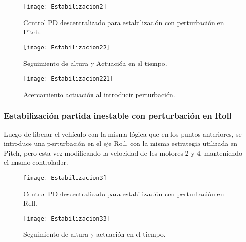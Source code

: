 \documentclass[\main/main.tex]{subfiles}
\begin{document}
\begin{figure}[H]
\noindent \begin{centering}
\texttt{[image: Estabilizacion2]}
\par\end{centering}
\caption{Control PD descentralizado para estabilización con perturbación en Pitch.}
\end{figure}

\begin{figure}[H]
\noindent \begin{centering}
\texttt{[image: Estabilizacion22]}
\par\end{centering}
\caption{Seguimiento de altura y Actuación en el tiempo.}
\end{figure}

\begin{figure}[H]
\noindent \begin{centering}
\texttt{[image: Estabilizacion221]}
\par\end{centering}
\caption{Acercamiento actuación al introducir perturbación.}
\end{figure}

\subsubsection{Estabilización partida inestable con perturbación en Roll}

Luego de liberar el vehículo con la misma lógica que en los puntos
anteriores, se introduce una perturbación en el eje Roll, con la misma
estrategia utilizada en Pitch, pero esta vez modificando la velocidad
de los motores 2 y 4, manteniendo el mismo controlador.

\begin{figure}[H]
\noindent \begin{centering}
\texttt{[image: Estabilizacion3]}
\par\end{centering}
\caption{Control PD descentralizado para estabilización con perturbación en Roll.}
\end{figure}

\begin{figure}[H]
\noindent \begin{centering}
\texttt{[image: Estabilizacion33]}
\par\end{centering}
\caption{Seguimiento de altura y actuación en el tiempo.}
\end{figure}
\end{document}
